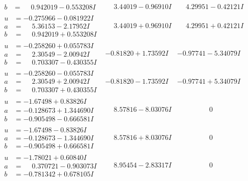 \documentclass[1p]{elsarticle_modified}
\theoremstyle{definition}
\begin{document}
$$\begin{array}{c|c|c}
\begin{aligned}
b &= \phantom{-}0.942019 - 0.553208 I\end{aligned}
 & \phantom{-}3.44019 - 0.96910 I & \phantom{-}4.29951 - 0.42121 I \\ \hline\begin{aligned}
u &= -0.275966 - 0.081922 I \\
a &= \phantom{-}5.36153 - 2.17952 I \\
b &= \phantom{-}0.942019 + 0.553208 I\end{aligned}
 & \phantom{-}3.44019 + 0.96910 I & \phantom{-}4.29951 + 0.42121 I \\ \hline\begin{aligned}
u &= -0.258260 + 0.055783 I \\
a &= \phantom{-}2.30549 - 2.00942 I \\
b &= \phantom{-}0.703307 - 0.430355 I\end{aligned}
 & -0.81820 + 1.73592 I & -0.97741 - 5.34079 I \\ \hline\begin{aligned}
u &= -0.258260 - 0.055783 I \\
a &= \phantom{-}2.30549 + 2.00942 I \\
b &= \phantom{-}0.703307 + 0.430355 I\end{aligned}
 & -0.81820 - 1.73592 I & -0.97741 + 5.34079 I \\ \hline\begin{aligned}
u &= -1.67498 + 0.83826 I \\
a &= -0.128673 + 1.344690 I \\
b &= -0.905498 - 0.666581 I\end{aligned}
 & \phantom{-}8.57816 - 8.03076 I & \phantom{-0.000000 } 0 \\ \hline\begin{aligned}
u &= -1.67498 - 0.83826 I \\
a &= -0.128673 - 1.344690 I \\
b &= -0.905498 + 0.666581 I\end{aligned}
 & \phantom{-}8.57816 + 8.03076 I & \phantom{-0.000000 } 0 \\ \hline\begin{aligned}
u &= -1.78021 + 0.60840 I \\
a &= \phantom{-}0.370721 - 0.903073 I \\
b &= -0.781342 + 0.678105 I\end{aligned}
 & \phantom{-}8.95454 - 2.83317 I & \phantom{-0.000000 } 0 \\ \hline\begin{aligned}

\end{aligned}
\end{array}$$
\end{document}
